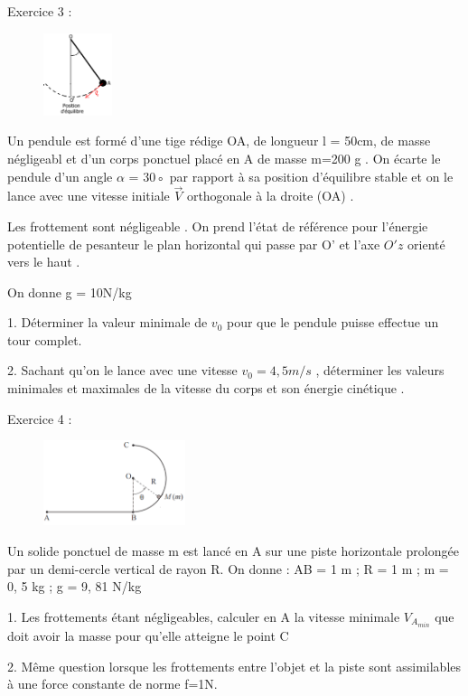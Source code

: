 \documentclass[12pt, french]{article}
\begin{document}
\begin{Box2}{Exercice 3 :}
\begin{figure}
  \begin{center}
    \includegraphics[width=0.18\textwidth]{./img/img02.png}
  \end{center}
\end{figure}
Un pendule est formé d’une tige rédige OA, de longueur l = 50cm, de masse négligeabl  et d’un corps ponctuel placé en A de masse m=200 g . On écarte le pendule d’un angle $\alpha$ = 30◦ par rapport à sa position d’équilibre stable et on le lance avec une vitesse initiale $\vec{V}$ orthogonale à la droite (OA) .

Les frottement sont négligeable . On prend l’état de référence pour l’énergie potentielle de pesanteur le plan horizontal qui passe par O’ et l’axe $O'z$ orienté vers le haut .

On donne g = 10N/kg

1. Déterminer la valeur minimale de $v_0$ pour que le pendule puisse effectue un tour complet.

2. Sachant qu’on le lance avec une vitesse $v_0 = 4, 5m/s$ , déterminer les valeurs minimales et maximales de la vitesse du corps et son énergie cinétique .

\end{Box2}

\begin{Box2}{Exercice 4 : }
\begin{figure}
  \begin{center}
    \includegraphics[width=0.37\textwidth]{./img/img03.png}
  \end{center}
\end{figure}
Un solide ponctuel de masse m est lancé en A sur une piste horizontale prolongée par un demi-cercle vertical de rayon R.
On donne : AB = 1 m ; R = 1 m ; m = 0, 5 kg ; g = 9, 81 N/kg

   1. Les frottements étant négligeables, calculer en A la vitesse minimale $V_{A_{min}}$ que doit avoir la masse pour qu’elle atteigne le point C

   2. Même question lorsque les frottements entre l’objet et la piste sont assimilables à une force constante de norme f=1N.

\end{Box2}
\end{document}
